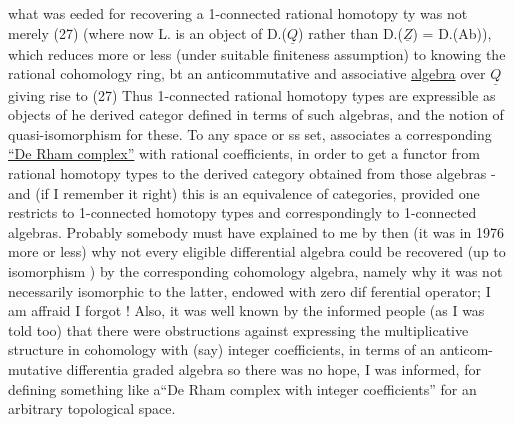 
what was eeded for recovering a 1-connected rational homotopy ty
was not merely (27)  (where now L. is an object of  D.($\underline{Q}$) rather than 
D.($\underline{Z}$) = D.(Ab)),  which reduces more or less  (under suitable
finiteness assumption) to knowing the rational cohomology ring,  bt
an anticommutative and associative  \uline{algebra}  over $\underline{Q}$ \over{,}{(}giving rise to (27) 
Thus 1-connected rational homotopy types are expressible as objects of
he derived categor defined in terms of such algebras,  and the  notion
of quasi-isomorphism for these.  To any space or ss set,   associates
a corresponding \uline{``De Rham complex''}  with rational coefficients,  in order
to get a functor from rational homotopy types to the derived category
obtained from those algebras  -  and (if I remember it right)  this is
an equivalence of categories,  provided one restricts to 1-connected
homotopy types\hand{,} and correspondingly to 1-connected algebras.  Probably
somebody must have explained to me by then (it was in 1976 more or less)
why not every eligible differential algebra could be recovered (up to
isomorphism ) by the corresponding  cohomology  algebra,  namely why
it was not necessarily isomorphic to the latter,  endowed with zero dif%
ferential operator;   I am affraid I forgot  !  Also,  it was
well known by the informed people  (as I was told too) that
there were obstructions against expressing the multiplicative structure
in cohomology with (say) integer coefficients,  in terms of an anticom-%
mutative differentia graded algebra\over{,}{;}  so there was no hope,  I was
informed,  for defining something like a``De Rham complex with integer
coefficients'' for an arbitrary topological space.

